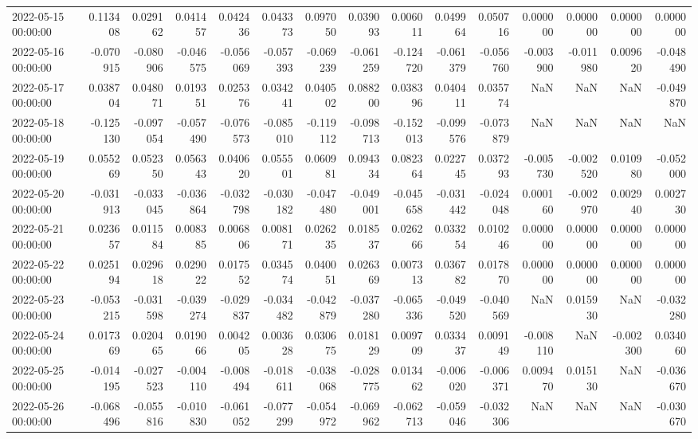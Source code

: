 \begin{tabular}{lrrrrrrrrrrrrrr}
2022-05-15 00:00:00 & 0.113408 & 0.029162 & 0.041457 & 0.042436 & 0.043373 & 0.097050 & 0.039093 & 0.006011 & 0.049964 & 0.050716 & 0.000000 & 0.000000 & 0.000000 & 0.000000 \\
2022-05-16 00:00:00 & -0.070915 & -0.080906 & -0.046575 & -0.056069 & -0.057393 & -0.069239 & -0.061259 & -0.124720 & -0.061379 & -0.056760 & -0.003900 & -0.011980 & 0.009620 & -0.048490 \\
2022-05-17 00:00:00 & 0.038704 & 0.048071 & 0.019351 & 0.025376 & 0.034241 & 0.040502 & 0.088200 & 0.038396 & 0.040411 & 0.035774 & NaN & NaN & NaN & -0.049870 \\
2022-05-18 00:00:00 & -0.125130 & -0.097054 & -0.057490 & -0.076573 & -0.085010 & -0.119112 & -0.098713 & -0.152013 & -0.099576 & -0.073879 & NaN & NaN & NaN & NaN \\
2022-05-19 00:00:00 & 0.055269 & 0.052350 & 0.056343 & 0.040620 & 0.055501 & 0.060981 & 0.094334 & 0.082364 & 0.022745 & 0.037293 & -0.005730 & -0.002520 & 0.010980 & -0.052000 \\
2022-05-20 00:00:00 & -0.031913 & -0.033045 & -0.036864 & -0.032798 & -0.030182 & -0.047480 & -0.049001 & -0.045658 & -0.031442 & -0.024048 & 0.000160 & -0.002970 & 0.002940 & 0.002730 \\
2022-05-21 00:00:00 & 0.023657 & 0.011584 & 0.008385 & 0.006806 & 0.008171 & 0.026235 & 0.018537 & 0.026266 & 0.033254 & 0.010246 & 0.000000 & 0.000000 & 0.000000 & 0.000000 \\
2022-05-22 00:00:00 & 0.025194 & 0.029618 & 0.029022 & 0.017552 & 0.034574 & 0.040051 & 0.026369 & 0.007313 & 0.036782 & 0.017870 & 0.000000 & 0.000000 & 0.000000 & 0.000000 \\
2022-05-23 00:00:00 & -0.053215 & -0.031598 & -0.039274 & -0.029837 & -0.034482 & -0.042879 & -0.037280 & -0.065336 & -0.049520 & -0.040569 & NaN & 0.015930 & NaN & -0.032280 \\
2022-05-24 00:00:00 & 0.017369 & 0.020465 & 0.019066 & 0.004205 & 0.003628 & 0.030675 & 0.018129 & 0.009709 & 0.033437 & 0.009149 & -0.008110 & NaN & -0.002300 & 0.034060 \\
2022-05-25 00:00:00 & -0.014195 & -0.027523 & -0.004110 & -0.008494 & -0.018611 & -0.038068 & -0.028775 & 0.013462 & -0.006020 & -0.006371 & 0.009470 & 0.015130 & NaN & -0.036670 \\
2022-05-26 00:00:00 & -0.068496 & -0.055816 & -0.010830 & -0.061052 & -0.077299 & -0.054972 & -0.069962 & -0.062713 & -0.059046 & -0.032306 & NaN & NaN & NaN & -0.030670 \\

\end{tabular}
